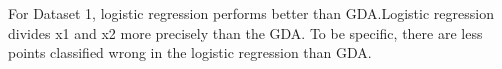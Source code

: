 \begin{answer}
    For Dataset 1, logistic regression performs better than GDA.Logistic regression divides x1 and x2 more precisely than the GDA. To be specific, there are less points classified wrong in the logistic regression than GDA. 
\end{answer}
